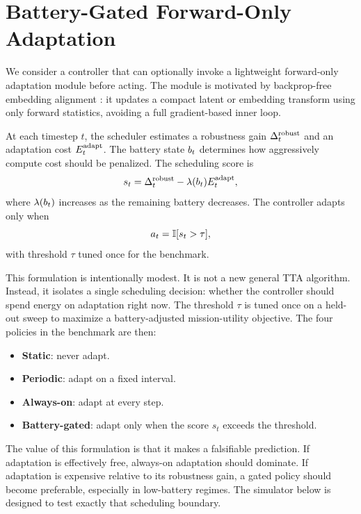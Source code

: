 \section{Battery-Gated Forward-Only Adaptation}

We consider a controller that can optionally invoke a lightweight forward-only adaptation module before acting. The module is motivated by backprop-free embedding alignment \citep{xiao2026architecture}: it updates a compact latent or embedding transform using only forward statistics, avoiding a full gradient-based inner loop.

At each timestep $t$, the scheduler estimates a robustness gain $\Delta^{\mathrm{robust}}_t$ and an adaptation cost $E^{\mathrm{adapt}}_t$. The battery state $b_t$ determines how aggressively compute cost should be penalized. The scheduling score is
\begin{equation}
s_t = \Delta^{\mathrm{robust}}_t - \lambda(b_t)E^{\mathrm{adapt}}_t,
\end{equation}
where $\lambda(b_t)$ increases as the remaining battery decreases. The controller adapts only when
\begin{equation}
a_t = \mathbb{I}[s_t > \tau],
\end{equation}
with threshold $\tau$ tuned once for the benchmark.

This formulation is intentionally modest. It is not a new general TTA algorithm. Instead, it isolates a single scheduling decision: whether the controller should spend energy on adaptation right now. The threshold $\tau$ is tuned once on a held-out sweep to maximize a battery-adjusted mission-utility objective. The four policies in the benchmark are then:
\begin{itemize}
\item \textbf{Static}: never adapt.
\item \textbf{Periodic}: adapt on a fixed interval.
\item \textbf{Always-on}: adapt at every step.
\item \textbf{Battery-gated}: adapt only when the score $s_t$ exceeds the threshold.
\end{itemize}

The value of this formulation is that it makes a falsifiable prediction. If adaptation is effectively free, always-on adaptation should dominate. If adaptation is expensive relative to its robustness gain, a gated policy should become preferable, especially in low-battery regimes. The simulator below is designed to test exactly that scheduling boundary.
